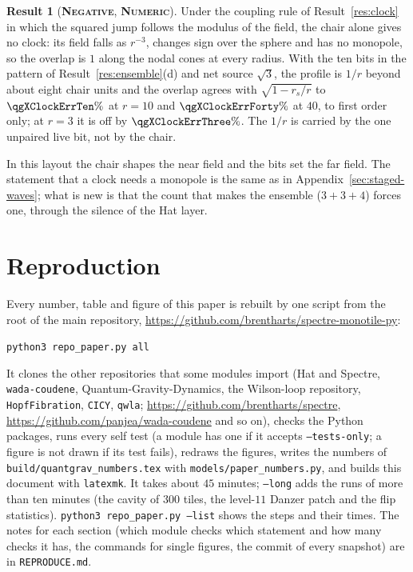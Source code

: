 \documentclass[11pt]{article}
\newcommand{\numeric}{\textbf{\textsc{Numeric}}}
\newcommand{\negres}{\textbf{\textsc{Negative}}}
\theoremstyle{definition}
\newtheorem{result}{Result}
\begin{document}
\begin{result}[\negres, \numeric]\label{res:third-clock}
Under the coupling rule of Result~\ref{res:clock} in which the squared jump follows the modulus of the field, the chair alone gives no clock: its field falls as $r^{-3}$, changes sign over the sphere and has no monopole, so the overlap is $1$ along the nodal cones at every radius. With the ten bits in the pattern of Result~\ref{res:ensemble}(d) and net source $\sqrt3$, the profile is $1/r$ beyond about eight chair units and the overlap agrees with $\sqrt{1-r_s/r}$ to $\qgXClockErrTen\%$ at $r=10$ and $\qgXClockErrForty\%$ at $40$, to first order only; at $r=3$ it is off by $\qgXClockErrThree\%$. The $1/r$ is carried by the one unpaired live bit, not by the chair.
\end{result}
In this layout the chair shapes the near field and the bits set the far field. The statement that a clock needs a monopole is the same as in Appendix~\ref{sec:staged-waves}; what is new is that the count that makes the ensemble ($3+3+4$) forces one, through the silence of the Hat layer.


\section{Reproduction}\label{app:repro}
Every number, table and figure of this paper is rebuilt by one script from the root of the main repository, \url{https://github.com/brentharts/spectre-monotile-py}:
\begin{center}\texttt{python3 repo\_paper.py all}\end{center}
It clones the other repositories that some modules import (Hat and Spectre, \texttt{wada-coudene}, Quantum-Gravity-Dynamics, the Wilson-loop repository, \texttt{HopfFibration}, \texttt{CICY}, \texttt{qwla}; \url{https://github.com/brentharts/spectre}, \url{https://github.com/panjea/wada-coudene} and so on), checks the Python packages, runs every self test (a module has one if it accepts \texttt{--tests-only}; a figure is not drawn if its test fails), redraws the figures, writes the numbers of \texttt{build/quantgrav\_numbers.tex} with \texttt{models/paper\_numbers.py}, and builds this document with \texttt{latexmk}. It takes about $45$ minutes; \texttt{--long} adds the runs of more than ten minutes (the cavity of $300$ tiles, the level-$11$ Danzer patch and the flip statistics). \texttt{python3 repo\_paper.py --list} shows the steps and their times. The notes for each section (which module checks which statement and how many checks it has, the commands for single figures, the commit of every snapshot) are in \texttt{REPRODUCE.md}.
\end{document}
